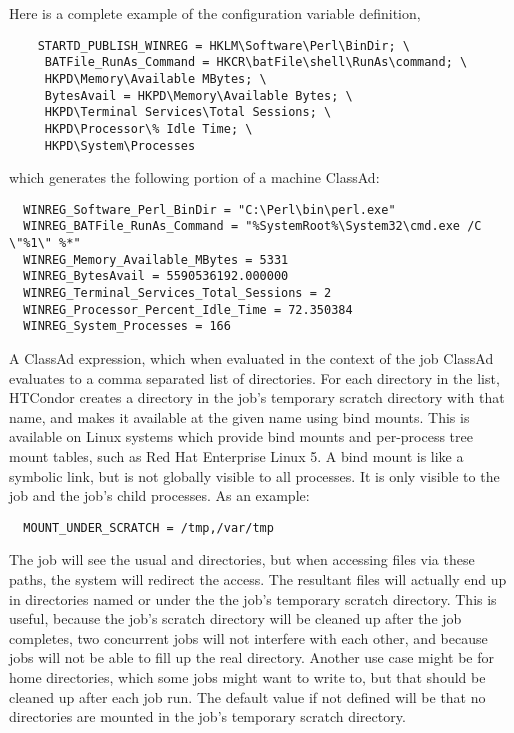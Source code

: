 \begin{description}
  Here is a complete example of the configuration variable definition,
\begin{verbatim}
    STARTD_PUBLISH_WINREG = HKLM\Software\Perl\BinDir; \
     BATFile_RunAs_Command = HKCR\batFile\shell\RunAs\command; \
     HKPD\Memory\Available MBytes; \
     BytesAvail = HKPD\Memory\Available Bytes; \
     HKPD\Terminal Services\Total Sessions; \
     HKPD\Processor\% Idle Time; \
     HKPD\System\Processes
\end{verbatim}
  which generates the following portion of a machine ClassAd: 
\begin{verbatim}
  WINREG_Software_Perl_BinDir = "C:\Perl\bin\perl.exe"
  WINREG_BATFile_RunAs_Command = "%SystemRoot%\System32\cmd.exe /C \"%1\" %*"
  WINREG_Memory_Available_MBytes = 5331
  WINREG_BytesAvail = 5590536192.000000
  WINREG_Terminal_Services_Total_Sessions = 2
  WINREG_Processor_Percent_Idle_Time = 72.350384
  WINREG_System_Processes = 166
\end{verbatim}

\label{param:MountUnderScratch}
\item[\Macro{MOUNT\_UNDER\_SCRATCH}]
  A ClassAd expression, which when evaluated in the context of the job ClassAd evaluates
  to a comma separated list of directories. 
  For each directory in the list, 
  HTCondor creates a directory in the job's temporary scratch directory 
  with that name,
  and makes it available at the given name using bind mounts.
  This is available on Linux systems which provide bind mounts 
  and per-process tree mount tables,
  such as Red Hat Enterprise Linux 5.  
  A bind mount is like a symbolic link,
  but is not globally visible to all processes.
  It is only visible to the job and the job's child processes.
  As an example:
\begin{verbatim}
  MOUNT_UNDER_SCRATCH = /tmp,/var/tmp
\end{verbatim}
  The job will see the usual \File{/tmp} and 
  directories, but when accessing files via these paths, the
  system will redirect the access. 
  The resultant files will actually end up in directories named 
  \File{tmp} or \File{var/tmp}
  under the the job's temporary scratch directory. 
  This is useful, because the job's scratch directory will be cleaned up 
  after the job completes, 
  two concurrent jobs will not interfere with each other,
  and because jobs will not be able to fill up the real  directory. 
  Another use case might be for home directories, which some jobs might want
  to write to, but that should be cleaned up after each job run.
  The default value if not defined will be that no directories are mounted in
  the job's temporary scratch directory.

\end{description}

